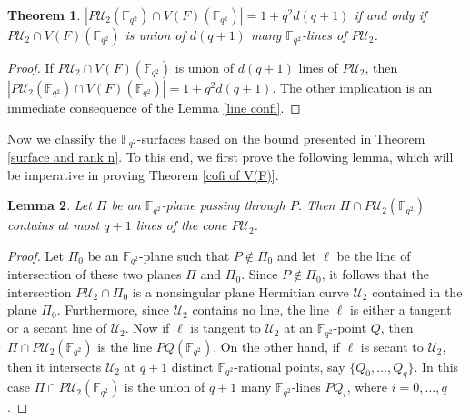 \documentclass[10pt,a4paper,oneside]{amsproc}
\newtheorem{theorem}{Theorem}[section]
\newtheorem{lemma}[theorem]{Lemma}
\newcommand{\Fqt}{\mathbb{F}_{q^2}}
\newcommand{\U}{\mathcal{U}}
\begin{document}
\begin{theorem}\label{attain con line}
  $|P\U_2(\Fqt)\cap V(F)(\Fqt)|=1+q^2d(q+1)$ if and only if $P\U_2\cap V(F)(\Fqt)$ is union of $d(q+1)$ many $\Fqt$-lines of $P\U_2$.    
\end{theorem}
\begin{proof}
  If $P\U_2\cap V(F)(\Fqt)$ is union of $d(q+1)$ lines of $P\U_2$, then $|P\U_2(\Fqt)\cap V(F)(\Fqt)|=1+q^2d(q+1)$. The other implication is an immediate consequence of the Lemma \ref{line confi}.  
\end{proof}
Now we classify the $\Fqt$-surfaces based on the bound presented in Theorem \ref{surface and rank n}. To this end, we first prove the following lemma, which will be imperative in proving Theorem \ref{cofi of V(F)}.
\begin{lemma}\label{plane cut}
 Let $\Pi$ be an $\Fqt$-plane passing through $P$. Then $\Pi\cap P\U_2(\Fqt)$ contains at most $q+1$ lines of the cone $P\U_2$.   
\end{lemma}
\begin{proof}
 Let $\Pi_0$ be an $\Fqt$-plane such that $P\notin \Pi_0$ and let $\ell$ be the line of intersection of these two planes $\Pi$ and $\Pi_0$. Since $P\notin \Pi_0$, it follows that the intersection $P\U_2\cap \Pi_0$ is a nonsingular plane Hermitian curve $\U_2$ contained in the plane $\Pi_0$. Furthermore, since $\U_2$ contains no line, the line $\ell$ is either a tangent or a secant line of $\U_2$. Now if $\ell$ is tangent to $\U_2$ at an $\Fqt$-point $Q$, then $\Pi\cap P\U_2(\Fqt)$ is the line $PQ(\Fqt)$. On the other hand, if $\ell$ is secant to $\U_2$, then it intersects $\U_2$ at $q+1$ distinct $\Fqt$-rational points, say $\{Q_0,\dots, Q_q\}$. In this case $\Pi\cap P\U_2(\Fqt)$ is the union of $q+1$ many $\Fqt$-lines $PQ_i$, where $i=0,\dots,q$.  
\end{proof}
\end{document}
